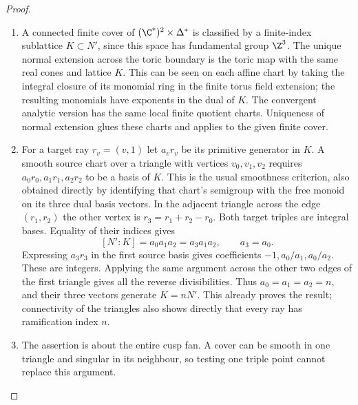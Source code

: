 \begin{proof}
\begin{enumerate}[label=\arabic*.,leftmargin=*]
\item A connected finite cover of $(\C^*)^2\times\Delta^*$ is classified by
a finite-index sublattice $K\subset N'$, since this space has fundamental
group $\Z^3$. The unique normal extension across the toric boundary is
the toric map with the same real cones and lattice $K$. This can be seen
on each affine chart by taking the integral closure of its monomial ring
in the finite torus field extension; the resulting monomials have
exponents in the dual of $K$. The convergent analytic version has the
same local finite quotient charts. Uniqueness of normal extension glues
these charts and applies to the given finite cover.

\item For a target ray $r_v=(v,1)$ let $a_vr_v$ be its primitive generator in
$K$. A smooth source chart over a triangle with vertices $v_0,v_1,v_2$
requires $a_0r_0,a_1r_1,a_2r_2$ to be a basis of $K$. This is the usual
smoothness criterion, also obtained directly by identifying that chart's
semigroup with the free monoid on its three dual basis vectors.
In the adjacent triangle across the edge $(r_1,r_2)$ the other vertex is
$r_3=r_1+r_2-r_0$. Both target triples are integral bases. Equality of
their indices gives
\[
 [N':K]=a_0a_1a_2=a_3a_1a_2,
 \qquad a_3=a_0.
\]
Expressing $a_3r_3$ in the first source basis gives coefficients
$-1,a_0/a_1,a_0/a_2$. These are integers. Applying the same argument
across the other two edges of the first triangle gives all the reverse
divisibilities. Thus $a_0=a_1=a_2=n$, and their three vectors generate
$K=nN'$. This already proves the result; connectivity of the triangles
also shows directly that every ray has ramification index $n$.

\item The assertion is about the entire cusp fan. A cover can be smooth in
one triangle and singular in its neighbour, so testing one triple point
cannot replace this argument.
\end{enumerate}
\end{proof}

